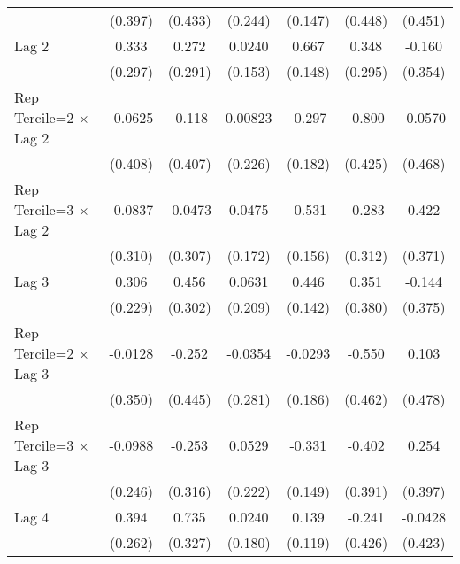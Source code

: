 \begin{table}[htbp]
\begin{tabular}{l*{6}{c}}
                &  (0.397)         &  (0.433)         &  (0.244)         &  (0.147)         &  (0.448)         &  (0.451)         \\
\addlinespace
Lag 2           &    0.333         &    0.272         &   0.0240         &    0.667\sym{***}&    0.348         &   -0.160         \\
                &  (0.297)         &  (0.291)         &  (0.153)         &  (0.148)         &  (0.295)         &  (0.354)         \\
\addlinespace
Rep Tercile=2 $\times$ Lag 2&  -0.0625         &   -0.118         &  0.00823         &   -0.297         &   -0.800         &  -0.0570         \\
                &  (0.408)         &  (0.407)         &  (0.226)         &  (0.182)         &  (0.425)         &  (0.468)         \\
\addlinespace
Rep Tercile=3 $\times$ Lag 2&  -0.0837         &  -0.0473         &   0.0475         &   -0.531\sym{***}&   -0.283         &    0.422         \\
                &  (0.310)         &  (0.307)         &  (0.172)         &  (0.156)         &  (0.312)         &  (0.371)         \\
\addlinespace
Lag 3           &    0.306         &    0.456         &   0.0631         &    0.446\sym{**} &    0.351         &   -0.144         \\
                &  (0.229)         &  (0.302)         &  (0.209)         &  (0.142)         &  (0.380)         &  (0.375)         \\
\addlinespace
Rep Tercile=2 $\times$ Lag 3&  -0.0128         &   -0.252         &  -0.0354         &  -0.0293         &   -0.550         &    0.103         \\
                &  (0.350)         &  (0.445)         &  (0.281)         &  (0.186)         &  (0.462)         &  (0.478)         \\
\addlinespace
Rep Tercile=3 $\times$ Lag 3&  -0.0988         &   -0.253         &   0.0529         &   -0.331\sym{*}  &   -0.402         &    0.254         \\
                &  (0.246)         &  (0.316)         &  (0.222)         &  (0.149)         &  (0.391)         &  (0.397)         \\
\addlinespace
Lag 4           &    0.394         &    0.735\sym{*}  &   0.0240         &    0.139         &   -0.241         &  -0.0428         \\
                &  (0.262)         &  (0.327)         &  (0.180)         &  (0.119)         &  (0.426)         &  (0.423)         \\

\end{tabular}
\end{table}
